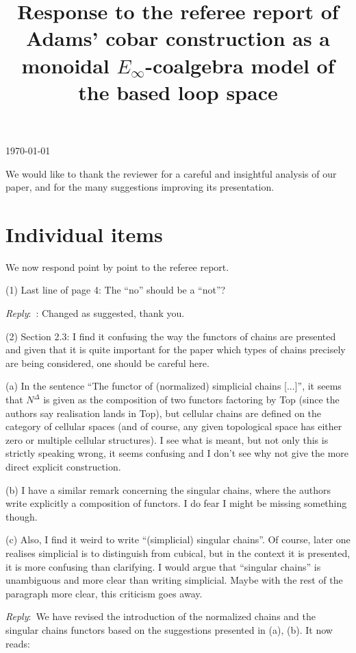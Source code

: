 \documentclass{amsart}
\title[Referee reply]{Response to the referee report of \\ Adams' cobar construction as a monoidal $E_{\infty}$-coalgebra model of the based loop space}
\newcommand{\ar}{\medskip\noindent\textit{Reply}:\ }
\newcommand{\rp}{\medskip\noindent}
\begin{document}
	\noindent\today
	\maketitle

	We would like to thank the reviewer for a careful and insightful analysis of our paper, and for the many suggestions improving its presentation.

	\section{Individual items}

	\noindent We now respond point by point to the referee report.

	\rp (1) Last line of page 4: The “no” should be a “not”?

	\ar: Changed as suggested, thank you.

	\rp (2) Section 2.3: I find it confusing the way the functors of chains are presented
	and given that it is quite important for the paper which types of chains
	precisely are being considered, one should be careful here.

	\rp (a) In the sentence “The functor of (normalized) simplicial chains [...]”, it seems that $N^\Delta$ is given as the composition of two functors factoring by Top (since the authors say realisation lands in Top), but cellular chains are defined on the category of cellular spaces (and of course, any
	given topological space has either zero or multiple cellular structures).
	I see what is meant, but not only this is strictly speaking wrong, it seems confusing and I don’t see why not give the more direct explicit construction.

	\rp (b) I have a similar remark concerning the singular chains, where the authors write explicitly a composition of functors.
	I do fear I might be missing something though.

	\rp (c) Also, I find it weird to write “(simplicial) singular chains”. Of course, later one realises simplicial is to distinguish from cubical, but in the context it is presented, it is more confusing than clarifying. I would	argue that “singular chains” is unambiguous and more clear than writing simplicial. Maybe with the rest of the paragraph more clear, this criticism goes away.

	\ar We have revised the introduction of the normalized chains and the singular chains functors based on the suggestions presented in (a), (b).
	It now reads:
\end{document}
